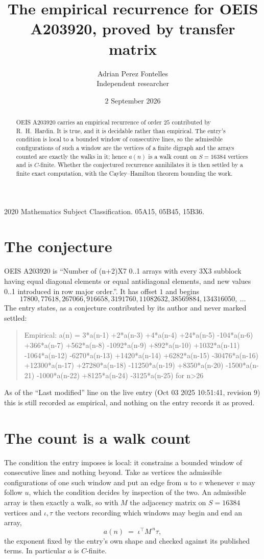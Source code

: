 \documentclass[11pt,a4paper]{article}
\title{The empirical recurrence for OEIS A203920, proved by transfer matrix}
\author{Adrian Perez Fontelles\\ \small Independent researcher}
\date{2 September 2026}
\theoremstyle{plain}
\theoremstyle{definition}
\begin{document}
\maketitle

\begin{abstract}
OEIS A203920 carries an empirical recurrence of order $25$ contributed by R.~H.~Hardin. It is
true, and it is decidable rather than empirical. The entry's condition is local to a bounded window of consecutive lines, so
the admissible configurations of such a window are the vertices of a finite digraph and the
arrays counted are exactly the walks in it; hence $a(n)$ is a walk count on $S=16384$ vertices
and is $C$-finite. Whether the conjectured recurrence annihilates it is then settled by a
finite exact computation, with the Cayley--Hamilton theorem bounding the work.
\end{abstract}

\noindent\small 2020 Mathematics Subject Classification. 05A15, 05B45, 15B36.\normalsize

\section{The conjecture}

OEIS A203920 is ``Number of (n+2)X7 0..1 arrays with every 3X3 subblock having equal diagonal elements or equal antidiagonal elements, and new values 0..1 introduced in row major order.''. It has offset $1$ and begins
\[
17800, 77618, 267066, 916658, 3191760, 11082632, 38569884, 134316050,\ \dots
\]
The entry states, as a conjecture contributed by its author and never marked settled:
\begin{quote}
Empirical: a(n) = 3*a(n-1) +2*a(n-3) +4*a(n-4) +24*a(n-5) -104*a(n-6) +366*a(n-7) +562*a(n-8) -1092*a(n-9) +892*a(n-10) +1032*a(n-11) -1064*a(n-12) -6270*a(n-13) +1420*a(n-14) +6282*a(n-15) -30476*a(n-16) +12300*a(n-17) +27280*a(n-18) -11250*a(n-19) +8350*a(n-20) -1500*a(n-21) -1000*a(n-22) +8125*a(n-24) -3125*a(n-25) for n>26
\end{quote}
As of the ``Last modified'' line on the live entry (Oct 03 2025 10:51:41, revision 9) this is still
recorded as empirical, and nothing on the entry records it as proved.

\section{The count is a walk count}

The condition the entry imposes is local: it constrains a bounded window of consecutive lines and nothing beyond. Take as
vertices the admissible configurations of one such window and put an edge from $u$ to $v$
whenever $v$ may follow $u$, which the condition decides by inspection of the two. An
admissible array is then exactly a walk, so with $M$ the adjacency matrix on $S=16384$ vertices
and $\iota,\tau$ the vectors recording which windows may begin and end an array,
\[
a(n)\;=\;\iota^{\!\top}M^{\,n}\tau ,
\]
the exponent fixed by the entry's own shape and checked against its published terms. In
particular $a$ is $C$-finite.
\end{document}
